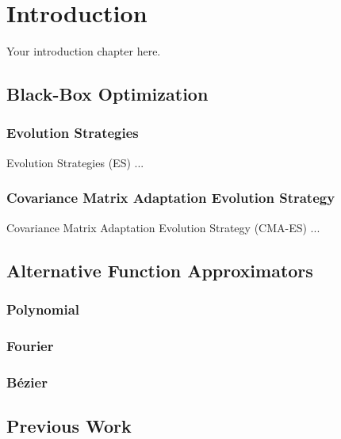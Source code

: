 
\chapter{Introduction}
\label{ch:introduction}

Your introduction chapter here.

\section{Black-Box Optimization}
\subsection{Evolution Strategies}
Evolution Strategies (ES) ...

\subsection{Covariance Matrix Adaptation Evolution Strategy}
Covariance Matrix Adaptation Evolution Strategy (CMA-ES) ...

\section{Alternative Function Approximators}
\subsection{Polynomial}

\subsection{Fourier}

\subsection{Bézier}


\section{Previous Work}

